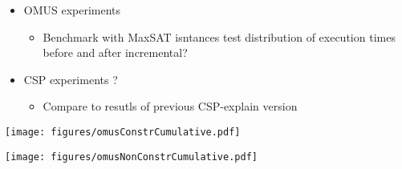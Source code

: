 

\begin{itemize}
    \item OMUS experiments
    \begin{itemize}
        \item Benchmark with MaxSAT isntances test distribution of execution times before and after incremental? 
    \end{itemize}
    \item CSP experiments ? 
    \begin{itemize}
        \item Compare to resutls of previous CSP-explain version
    \end{itemize}
\end{itemize}

\begin{figure*}[]
    \centering
    \texttt{[image: figures/omusConstrCumulative.pdf]}
    \caption{}
    \label{}
\end{figure*}


\begin{figure*}[]
    \centering
    \texttt{[image: figures/omusNonConstrCumulative.pdf]}
    \caption{}
    \label{}
\end{figure*}